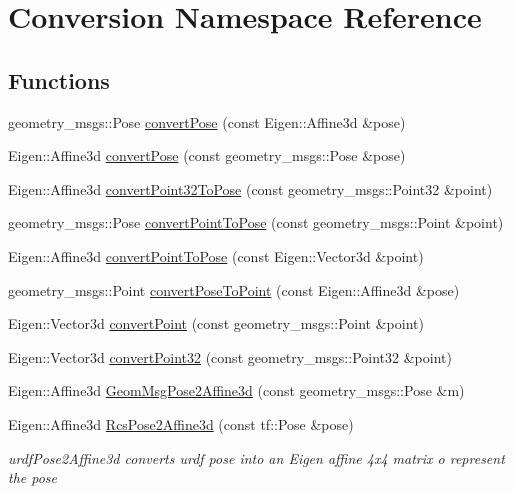 \hypertarget{namespaceConversion}{\section{Conversion Namespace Reference}
\label{namespaceConversion}
}
\subsection*{Functions}
\begin{DoxyCompactItemize}
\item 
geometry\-\_\-msgs\-::\-Pose \hyperlink{namespaceConversion_a5c5230c0963960b42c69f9e92915cfd5}{convert\-Pose} (const Eigen\-::\-Affine3d \&pose)
\item 
Eigen\-::\-Affine3d \hyperlink{namespaceConversion_ab8fe857c52fbe456743bc790d2d52958}{convert\-Pose} (const geometry\-\_\-msgs\-::\-Pose \&pose)
\item 
Eigen\-::\-Affine3d \hyperlink{namespaceConversion_aa1f281db7896bdc4ce55cab667ae845b}{convert\-Point32\-To\-Pose} (const geometry\-\_\-msgs\-::\-Point32 \&point)
\item 
geometry\-\_\-msgs\-::\-Pose \hyperlink{namespaceConversion_a6bf288fe662770b1d7241553ed513614}{convert\-Point\-To\-Pose} (const geometry\-\_\-msgs\-::\-Point \&point)
\item 
Eigen\-::\-Affine3d \hyperlink{namespaceConversion_a227cd31eb73a02d856d43405ab00c1bb}{convert\-Point\-To\-Pose} (const Eigen\-::\-Vector3d \&point)
\item 
geometry\-\_\-msgs\-::\-Point \hyperlink{namespaceConversion_a1272e9a32daed65a131a3f4bfad16c5b}{convert\-Pose\-To\-Point} (const Eigen\-::\-Affine3d \&pose)
\item 
Eigen\-::\-Vector3d \hyperlink{namespaceConversion_a55cdb367be061b3e6512ac5426e9b554}{convert\-Point} (const geometry\-\_\-msgs\-::\-Point \&point)
\item 
Eigen\-::\-Vector3d \hyperlink{namespaceConversion_ac592445ac44d157e178649e56a6895d7}{convert\-Point32} (const geometry\-\_\-msgs\-::\-Point32 \&point)
\item 
Eigen\-::\-Affine3d \hyperlink{namespaceConversion_a2aa10d5b36442df4d217a9901cd34227}{Geom\-Msg\-Pose2\-Affine3d} (const geometry\-\_\-msgs\-::\-Pose \&m)
\item 
Eigen\-::\-Affine3d \hyperlink{namespaceConversion_ae3495ef8be9d5a70f4d64d2d60dfdfbf}{Rcs\-Pose2\-Affine3d} (const tf\-::\-Pose \&pose)
\begin{DoxyCompactList}\small\item\em urdf\-Pose2\-Affine3d converts urdf pose into an Eigen affine 4x4 matrix o represent the pose \end{DoxyCompactList}\item 

\end{DoxyCompactItemize}
